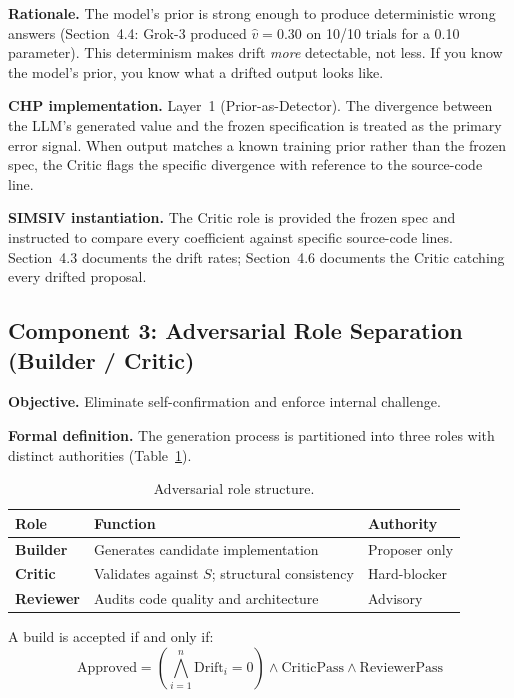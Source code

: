\documentclass[11pt,a4paper]{article}
\begin{document}
\textbf{Rationale.} The model's prior is strong enough to produce deterministic wrong answers (Section~4.4: Grok-3 produced $\hat{v} = 0.30$ on 10/10 trials for a 0.10 parameter). This determinism makes drift \textit{more} detectable, not less. If you know the model's prior, you know what a drifted output looks like.

\textbf{CHP implementation.} Layer~1 (Prior-as-Detector). The divergence between the LLM's generated value and the frozen specification is treated as the primary error signal. When output matches a known training prior rather than the frozen spec, the Critic flags the specific divergence with reference to the source-code line.

\textbf{SIMSIV instantiation.} The Critic role is provided the frozen spec and instructed to compare every coefficient against specific source-code lines. Section~4.3 documents the drift rates; Section~4.6 documents the Critic catching every drifted proposal.

\subsection{Component 3: Adversarial Role Separation (Builder / Critic)}

\textbf{Objective.} Eliminate self-confirmation and enforce internal challenge.

\textbf{Formal definition.} The generation process is partitioned into three roles with distinct authorities (Table~\ref{tab:roles}).

\begin{table}[ht]
\centering
\caption{Adversarial role structure.}
\label{tab:roles}
\begin{tabular}{@{}lll@{}}
\toprule
Role & Function & Authority \\
\midrule
\textbf{Builder} & Generates candidate implementation & Proposer only \\
\textbf{Critic} & Validates against $S$; structural consistency & Hard-blocker \\
\textbf{Reviewer} & Audits code quality and architecture & Advisory \\
\bottomrule
\end{tabular}
\end{table}

A build is accepted if and only if:
\begin{equation}
\text{Approved} = \left(\bigwedge_{i=1}^{n} \text{Drift}_i = 0\right) \wedge \text{CriticPass} \wedge \text{ReviewerPass}
\end{equation}
\end{document}
